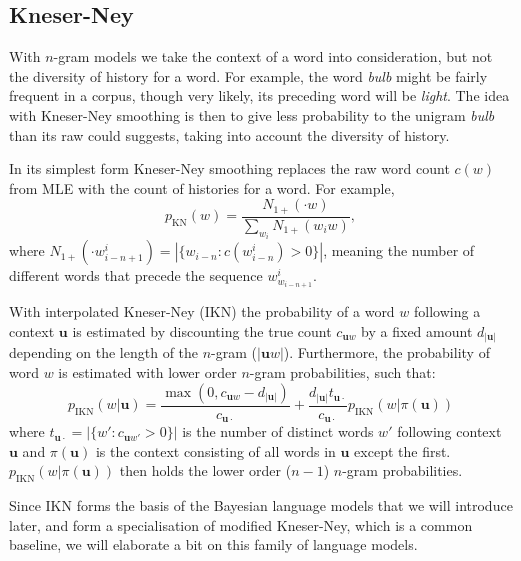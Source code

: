 \subsection{Kneser-Ney}
With $n$-gram models we take the context of a word into consideration, but not the diversity of history for a word. For example, the word \emph{bulb} might be fairly frequent in a corpus, though very likely, its preceding word will be \emph{light}. The idea with Kneser-Ney smoothing is then to give less probability to the unigram \emph{bulb} than its raw could suggests, taking into account the diversity of history.

In its simplest form\autocite{kneser1995improved} Kneser-Ney smoothing replaces the raw word count $c(w)$ from MLE with the count of histories for a word. For example,  
\begin{equation}
p_{\operatorname{KN}}(w) = \frac{N_{1+} (\cdot w)}{\sum_{w_i}N_{1+} (w_iw)},
\end{equation}
where $N_{1+}(\cdot w^i_{i-n+1}) = |\{w_{i-n} : c(w^i_{i-n} )> 0\}|$, meaning the number of different words that precede the sequence $w^i_{w_{i-n+1}}$.

With interpolated Kneser-Ney (IKN) the probability of a word $w$ following a context $\mathbf{u}$ is estimated by discounting the true count $c_{\mathbf{u}w}$ by a fixed amount $d_{|\mathbf{u}|}$ depending on the length of the $n$-gram ($|\mathbf{u}w|$). Furthermore, the probability of word $w$ is estimated with lower order $n$-gram probabilities, such that:
\begin{equation}
p_{\operatorname{IKN}}(w|\mathbf{u}) = \frac{\max(0, c_{\mathbf{u}w} - d_{|\mathbf{u}|})}{c_{\mathbf{u}\cdot}} + \frac{d_{|\mathbf{u}|}t_{\mathbf{u}\cdot}}{c_{\mathbf{u}\cdot}}p_{\operatorname{IKN}}(w|\pi(\mathbf{u}))
\end{equation}
where $t_{\mathbf{u}\cdot} = |\{ w' : c_{\mathbf{u}w'} > 0 \}|$ is the number of distinct words $w'$ following context $\mathbf{u}$ and $\pi(\mathbf{u})$ is the context consisting of all words in $\mathbf{u}$ except the first. $p_{\operatorname{IKN}}(w|\pi(\mathbf{u}))$ then holds the lower order ($n-1$) $n$-gram probabilities. 

Since IKN forms the basis of the Bayesian language models that we will introduce later, and form a specialisation of modified Kneser-Ney, which is a common baseline, we will elaborate a bit on this family of language models.

